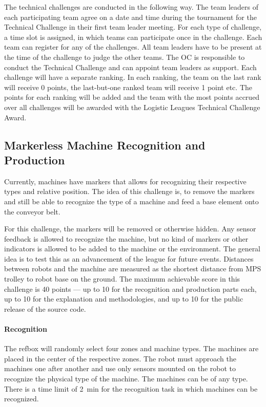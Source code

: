 \documentclass[12pt,twoside]{article}
\begin{document}
The technical challenges are conducted in the following way. The team
leaders of each participating team agree on a date and time during the
tournament for the Technical Challenge in their first team leader
meeting. For each type of challenge, a time slot is assigned, in which
teams can participate once in the challenge. Each team can register
for any of the challenges. All team leaders have to be present at the
time of the challenge to judge the other teams. The \ac{OC} is responsible
to conduct the Technical Challenge and can appoint team leaders as
support. Each challenge will have a separate ranking. In each ranking,
the team on the last rank will receive 0 points, the last-but-one
ranked team will receive 1 point etc. The points for each ranking will
be added and the team with the most points accrued over all challenges
will be awarded with the Logistic Leagues Technical Challenge Award.



\subsection{Markerless Machine Recognition and Production}
Currently, machines have markers that allows for recognizing their
respective types and relative position. The idea of this challenge is,
to remove the markers and still be able to recognize the type of a
machine and feed a base element onto the conveyor belt.

For this challenge, the markers will be removed or otherwise
hidden. Any sensor feedback is allowed to recognize the machine, but
no kind of markers or other indicators is allowed to be added to the
machine or the environment. The general idea is to test this as an
advancement of the league for future events. Distances between robots
and the machine are measured as the shortest distance from \ac{MPS} trolley
to robot base on the ground. The maximum achievable score in this
challenge is 40 points --- up to 10 for the recognition and production
parts each, up to 10 for the explanation and methodologies, and up to
10 for the public release of the source code.

\vspace{-2ex}\paragraph{Recognition}
The \ac{refbox} will randomly select four zones and machine types. The
machines are placed in the center of the respective zones. The robot
must approach the machines one after another and use only sensors
mounted on the robot to recognize the physical type of the
machine. The machines can be of any type. There is a time limit of
\SI{2}{\minute} for the recognition task in which machines can be recognized.
\end{document}
